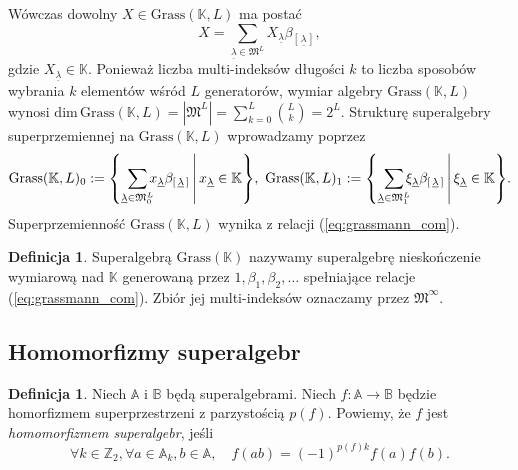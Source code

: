 \documentclass[11pt,a4paper]{report}
\theoremstyle{definition}
\newtheorem{definition}[theorem]{Definicja}
\begin{document}
Wówczas dowolny $X \in \mathrm{Grass}(\mathbb{K},L)$ ma postać
\begin{equation*}
X = \!\! \sum_{\underline{\lambda} \in \mathfrak{M}^L} \!\!X_{\underline{\lambda}} \beta_{\left[\, \underline{\lambda}\, \right]},
\end{equation*}
gdzie $X_{\underline{\lambda}} \in \mathbb{K}$. Ponieważ liczba multi-indeksów długości $k$ to liczba sposobów wybrania $k$ elementów wśród $L$ generatorów, wymiar algebry $\mathrm{Grass}(\mathbb{K},L)$ wynosi $\textrm{dim}\,\mathrm{Grass}(\mathbb{K},L)=|\mathfrak{M}^{L}| = \sum_{k=0}^{L} \binom{L}{k} = 2^L.$ Strukturę superalgebry superprzemiennej na $\mathrm{Grass}(\mathbb{K},L)$ wprowadzamy poprzez
\begin{equation*}
\mathrm{Grass}(\mathbb{K},L)_0 := \mleft\{ \sum_{\underline{\lambda} \in \mathfrak{M}^L_{0}} \!\!\! x_{\underline{\lambda}} \beta_{\left[\, \underline{\lambda}\, \right]} \,\middle|\, x_{\underline{\lambda}} \in \mathbb{K} \mright\},
\ \mathrm{Grass}(\mathbb{K},L)_1 := \mleft\{ \sum_{\underline{\lambda} \in \mathfrak{M}^L_{1}} \!\!\! \xi_{\underline{\lambda}} \beta_{\left[\, \underline{\lambda}\, \right]} \,\middle|\, \xi_{\underline{\lambda}} \in \mathbb{K} \mright\}.
\end{equation*}
Superprzemienność $\mathrm{Grass}(\mathbb{K},L)$ wynika z relacji (\ref{eq:grassmann_com}).

\begin{definition}
 Superalgebrą $\mathrm{Grass}(\mathbb{K})$ nazywamy superalgebrę nieskończenie wymiarową nad $\mathbb{K}$ generowaną przez $1, \beta_1, \beta_2, \ldots$ spełniające relacje (\ref{eq:grassmann_com}). Zbiór jej multi-indeksów oznaczamy przez $\mathfrak{M}^\infty$.
\end{definition}

\subsection{Homomorfizmy superalgebr}

\begin{definition}
\label{superalgebra_homomorphism}
  Niech $\mathbb{A}$ i $\mathbb{B}$ będą superalgebrami. Niech $f: \mathbb{A} \rightarrow \mathbb{B}$ będzie homorfizmem superprzestrzeni z parzystością $p(f)$. Powiemy, że $f$ jest \textit{homomorfizmem superalgebr}, jeśli
  \begin{equation*}
    \forall k \in \mathbb{Z}_2, \forall a \in \mathbb{A}_k, b \in \mathbb{A}, \quad f(ab) = (-1)^{p(f)k}f(a)f(b).
  \end{equation*}
\end{definition}
\end{document}
